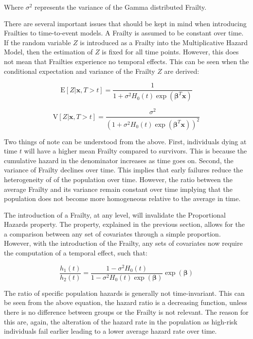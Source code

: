 Where $\sigma^2$ represents the variance of the Gamma distributed Frailty.


There are several important issues that should be kept in mind when introducing Frailties to time-to-event models. A Frailty is assumed to be constant over time. If the random variable $Z$ is introduced as a Frailty into the Multiplicative Hazard Model, then the estimation of $Z$ is fixed for all time points. However, this does not mean that Frailties experience no temporal effects. This can be seen when the conditional expectation and variance of the Frailty $Z$ are derived:

$$\mathrm{E}[Z|\textbf{x},  T > t ] = \frac{1}{1 + \sigma^2 H_0(t) \exp(\boldsymbol\beta^T \textbf{x})} $$

$$ \mathrm{V}[Z|\textbf{x},  T > t ] = \frac{\sigma^2}{(1 + \sigma^2 H_0(t) \exp(\boldsymbol\beta^T \textbf{x}))^2} $$

Two things of note can be understood from the above. First, individuals dying at time $t$ will have a higher mean Frailty compared to survivors. This is because the cumulative hazard in the denominator increases as time goes on. Second, the variance of Frailty declines over time. This implies that early failures reduce the heterogeneity of of the population over time. However, the ratio between the average Frailty and its variance remain constant over time implying that the population does not become more homogeneous relative to the average in time\cite{Wienke2010}.

The introduction of a Frailty, at any level, will invalidate the Proportional Hazards property\cite{Kleinbaum2005}. The property, explained in the previous section, allows for the a comparison between any set of covariates through a simple proportion. However, with the introduction of the Frailty, any sets of covariates now require the computation of a temporal effect, such that:

$$ \frac{h_1(t)}{h_2(t)} = \frac{1 - \sigma^2 H_0(t)}{1 - \sigma^2 H_0(t) \exp(\boldsymbol\beta)} \exp(\boldsymbol\beta) $$

The ratio of specific population hazards is generally not time-invariant. This can be seen from the above equation, the hazard ratio is a decreasing function, unless there is no difference between groups or the Frailty is not relevant. The reason for this are, again, the alteration of the hazard rate in the population as high-risk individuals fail earlier leading to a lower average hazard rate over time.

